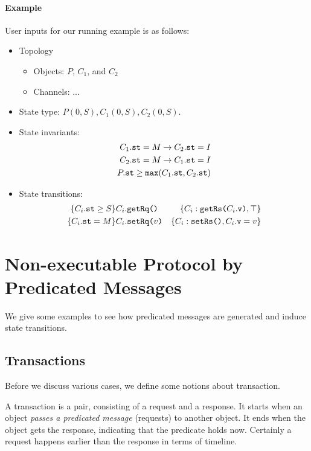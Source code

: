 \documentclass[format=manuscript]{acmart}
\begin{document}
\paragraph{Example} User inputs for our running example is as follows:
\begin{itemize}
\item Topology
  \begin{itemize}
  \item Objects: $P$, $C_1$, and $C_2$
  \item Channels: ...
  \end{itemize}
\item State type: $P(0, S), C_1(0, S), C_2(0, S)$.
\item State invariants:
  \begin{align}
    C_1.\texttt{st} = M \to C_2.\texttt{st} = I \label{inv1} \\
    C_2.\texttt{st} = M \to C_1.\texttt{st} = I \label{inv2} \\
    P.\texttt{st} \geq \texttt{max}(C_1.\texttt{st}, C_2.\texttt{st}) \label{inv3}
  \end{align}
\item State transitions:
  \begin{eqnarray}
    \{ C_i.\texttt{st} \geq S \}
    & C_i.\texttt{getRq()}
    & \{ C_i:\texttt{getRs(}C_i.\texttt{v}\texttt{)}, \top \} \label{trs1} \\
    \{ C_i.\texttt{st} = M \}
    & C_i.\texttt{setRq(}v\texttt{)}
    & \{ C_i:\texttt{setRs()}, C_i.\texttt{v} = v \} \label{trs2}
  \end{eqnarray}
\end{itemize}

\section{Non-executable Protocol by Predicated Messages}

We give some examples to see how predicated messages are generated and induce
state transitions.

\subsection{Transactions}

Before we discuss various cases, we define some notions about transaction.

\begin{definition}[Transaction]
  A transaction is a pair, consisting of a request and a response. It starts
  when an object \emph{passes a predicated message} (requests) to another
  object. It ends when the object gets the response, indicating that the
  predicate holds now. Certainly a request happens earlier than the response in
  terms of timeline.
\end{definition}
\end{document}
